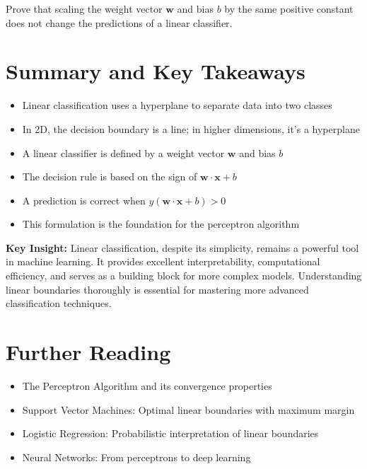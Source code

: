 \documentclass{article}
\newcommand{\insight}[1]{\begin{mdframed}[backgroundcolor=yellow!10, linewidth=0pt]
\textbf{Key Insight:} #1
\end{mdframed}}
\begin{document}
\begin{tcolorbox}[colback=gray!10, colframe=gray!50!black, title=Problem 3]
Prove that scaling the weight vector $\mathbf{w}$ and bias $b$ by the same positive constant does not change the predictions of a linear classifier.
\end{tcolorbox}

\section{Summary and Key Takeaways}

\begin{itemize}
    \item Linear classification uses a hyperplane to separate data into two classes
    \item In 2D, the decision boundary is a line; in higher dimensions, it's a hyperplane
    \item A linear classifier is defined by a weight vector $\mathbf{w}$ and bias $b$
    \item The decision rule is based on the sign of $\mathbf{w} \cdot \mathbf{x} + b$
    \item A prediction is correct when $y(\mathbf{w} \cdot \mathbf{x} + b) > 0$
    \item This formulation is the foundation for the perceptron algorithm
\end{itemize}

\insight{Linear classification, despite its simplicity, remains a powerful tool in machine learning. It provides excellent interpretability, computational efficiency, and serves as a building block for more complex models. Understanding linear boundaries thoroughly is essential for mastering more advanced classification techniques.}

\section{Further Reading}

\begin{itemize}
    \item The Perceptron Algorithm and its convergence properties
    \item Support Vector Machines: Optimal linear boundaries with maximum margin
    \item Logistic Regression: Probabilistic interpretation of linear boundaries
    \item Neural Networks: From perceptrons to deep learning
\end{itemize}
\end{document}

